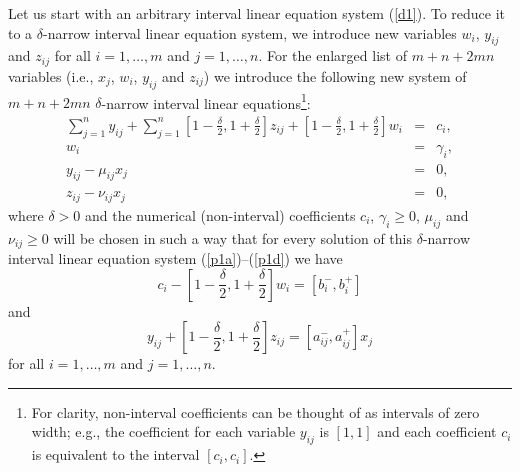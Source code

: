 Let us start with an arbitrary interval linear equation system (\ref{d1}).  To
reduce it to a $\delta$-narrow interval linear equation system, we introduce
new variables $w_i$, $y_{ij}$ and $z_{ij}$ for all $i=1,\ldots,m$ and
$j=1,\ldots,n$.  For the enlarged list of $m+n+2mn$ variables (i.e., $x_j$,
$w_i$, $y_{ij}$ and $z_{ij}$) we introduce the following new system of
$m+n+2mn$ $\delta$-narrow interval linear equations\footnote{For clarity,
non-interval coefficients can be thought of as intervals of zero width; e.g., 
the coefficient for each variable $y_{ij}$ is $[1,1]$ and each coefficient 
$c_i$ is equivalent to the interval $[c_i,c_i]$.}:
\begin{eqnarray}
  \sum_{j=1}^n y_{ij} +
   \sum_{j=1}^n [1-\frac{\delta}{2},1+\frac{\delta}{2}]z_{ij} +
   [1-\frac{\delta}{2},1+\frac{\delta}{2}]w_i &=& c_i, \label{p1a}\\
  w_i &=& \gamma_i, \label{p1b}\\
  y_{ij} - \mu_{ij} x_j &=& 0, \label{p1c}\\
  z_{ij} - \nu_{ij} x_j &=& 0, \label{p1d}
\end{eqnarray}
where $\delta>0$ and the numerical (non-interval) coefficients $c_i$,
$\gamma_i\geq 0$, $\mu_{ij}$ and $\nu_{ij}\geq 0$ will be chosen in such a
way that for every solution of this $\delta$-narrow interval linear equation
system (\ref{p1a})--(\ref{p1d}) we have
\begin{equation}
  c_i - [1 - \frac{\delta}{2}, 1 + \frac{\delta}{2}] w_i =
   [b_i^-, b_i^+] \label{p2}
\end{equation}
and
\begin{equation}
  y_{ij} + [1 - \frac{\delta}{2}, 1 + \frac{\delta}{2}] z_{ij} =
   [a_{ij}^-, a_{ij}^+] x_j \label{p3}
\end{equation}
for all $i=1,\ldots,m$ and $j=1,\ldots,n$.


